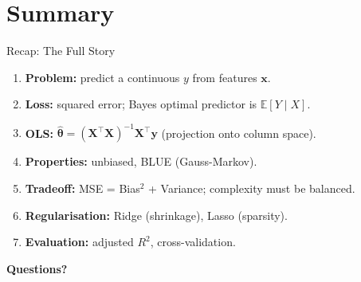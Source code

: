 \documentclass[aspectratio=169, professionalfonts]{beamer}
\def\E{\mathbb{E}}
\begin{document}
\section{Summary}

\begin{frame}{Recap: The Full Story}

\begin{enumerate}
  \item \textbf{Problem:} predict a continuous $y$ from features $\mathbf{x}$.
  \item \textbf{Loss:} squared error; Bayes optimal predictor is
        $\E[Y\mid X]$.
  \item \textbf{OLS:}
        $\hat{\bm{\theta}} = (\mathbf{X}^\top\mathbf{X})^{-1}
         \mathbf{X}^\top\mathbf{y}$
        (projection onto column space).
  \item \textbf{Properties:} unbiased, BLUE (Gauss-Markov).
  \item \textbf{Tradeoff:} MSE = Bias$^2$ + Variance; complexity
        must be balanced.
  \item \textbf{Regularisation:} Ridge (shrinkage), Lasso (sparsity).
  \item \textbf{Evaluation:} adjusted $R^2$, cross-validation.
\end{enumerate}

\end{frame}

{
\begin{frame}[c]
\centering
\Huge\textbf{Questions?}
\end{frame}
}
\end{document}
